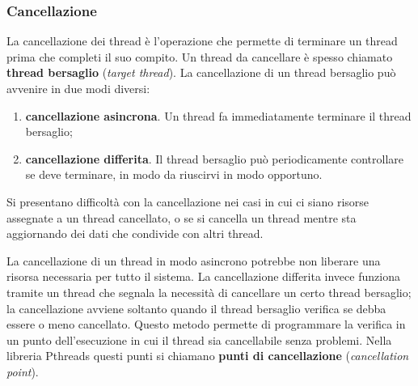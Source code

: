 \documentclass[11pt,a4paper]{article}
\begin{document}
\subsubsection{Cancellazione}
La cancellazione dei thread è l'operazione che permette di terminare un thread prima che
completi il suo compito.
Un thread da cancellare è spesso chiamato \textbf{thread bersaglio} (\emph{target thread}). La cancel­lazione di un thread bersaglio può avvenire in due modi diversi:
\begin{enumerate}[noitemsep, leftmargin=*]
  \item \textbf{cancellazione asincrona}. Un thread fa immediatamente terminare il thread bersaglio;
  \item \textbf{cancellazione differita}. Il thread bersaglio può periodicamente controllare se deve ter­minare, in modo da riuscirvi in modo opportuno.
\end{enumerate}
Si presentano difficoltà con la cancellazione nei casi in cui ci siano risorse assegnate a un thre­ad cancellato, o se si cancella un thread mentre sta aggiornando dei dati che condivide con al­tri thread.

La cancellazione di un
thread in modo asincrono potrebbe non liberare una risorsa necessaria per tutto il sistema.
La cancellazione differita invece funziona tramite un thread che segnala la necessità di
cancellare un certo thread bersaglio; la cancellazione avviene soltanto quando il thread ber­saglio verifica se debba essere o meno cancellato. Questo metodo permette di programmare
la verifica in un punto dell'esecuzione in cui il thread sia cancellabile senza problemi. Nella
libreria Pthreads questi punti si chiamano \textbf{punti di cancellazione} (\emph{cancellation point}).
\end{document}
